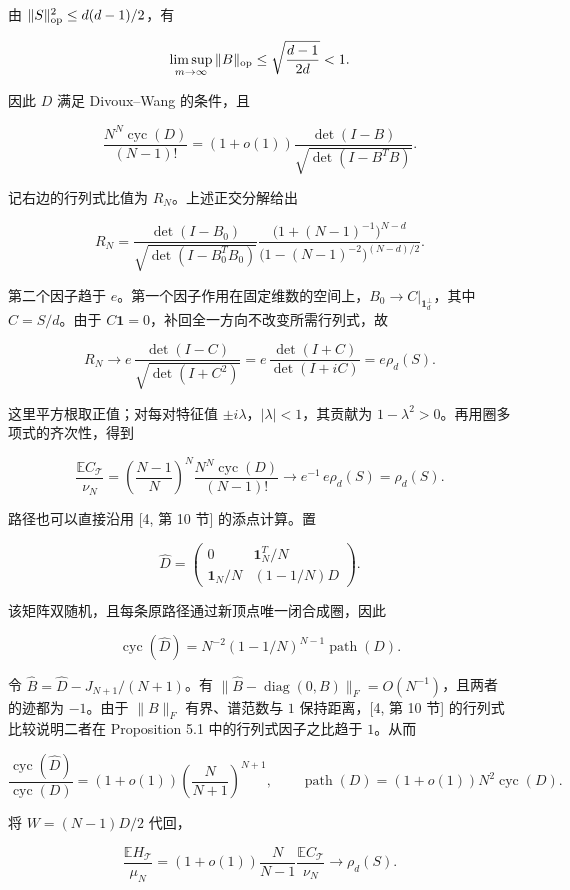 \documentclass[11pt,a4paper]{article}
\begin{document}
由 \(\|S\|_{\rm op}^2\le d(d-1)/2\)，有

\[\limsup_{m\to\infty}\|B\|_{\rm op}
\le\sqrt{\frac{d-1}{2d}}<1.\]

因此 \(D\) 满足 Divoux--Wang 的条件，且

\[\frac{N^N\operatorname{cyc}(D)}{(N-1)!}
=(1+o(1))\frac{\det(I-B)}{\sqrt{\det(I-B^TB)}}.\]

记右边的行列式比值为 \(R_N\)。上述正交分解给出

\[R_N=
\frac{\det(I-B_0)}{\sqrt{\det(I-B_0^TB_0)}}
\frac{\bigl(1+(N-1)^{-1}\bigr)^{N-d}}
{\bigl(1-(N-1)^{-2}\bigr)^{(N-d)/2}}.\]

第二个因子趋于 \(e\)。第一个因子作用在固定维数的空间上，\(B_0\to C|_{\mathbf1_d^\perp}\)，其中 \(C=S/d\)。由于 \(C\mathbf1=0\)，补回全一方向不改变所需行列式，故

\[R_N\longrightarrow
e\,\frac{\det(I-C)}{\sqrt{\det(I+C^2)}}
=e\,\frac{\det(I+C)}{\det(I+iC)}
=e\rho_d(S).\]

这里平方根取正值；对每对特征值 \(\pm i\lambda\)，\(|\lambda|<1\)，其贡献为 \(1-\lambda^2>0\)。再用圈多项式的齐次性，得到

\[\frac{\mathbb EC_{\mathcal T}}{\nu_N}
=\left(\frac{N-1}{N}\right)^N
\frac{N^N\operatorname{cyc}(D)}{(N-1)!}
\longrightarrow e^{-1}\,e\rho_d(S)=\rho_d(S).\]

路径也可以直接沿用 {[}4, 第 10 节{]} 的添点计算。置

\[\widehat D=
\begin{pmatrix}
0&\mathbf1_N^T/N\\
\mathbf1_N/N&(1-1/N)D
\end{pmatrix}.\]

该矩阵双随机，且每条原路径通过新顶点唯一闭合成圈，因此

\[\operatorname{cyc}(\widehat D)
=N^{-2}(1-1/N)^{N-1}\operatorname{path}(D).\]

令 \(\widehat B=\widehat D-J_{N+1}/(N+1)\)。有 \(\|\widehat B-\operatorname{diag}(0,B)\|_F=O(N^{-1})\)，且两者的迹都为 \(-1\)。由于 \(\|B\|_F\) 有界、谱范数与 \(1\) 保持距离，{[}4, 第 10 节{]} 的行列式比较说明二者在 Proposition 5.1 中的行列式因子之比趋于 \(1\)。从而

\[\frac{\operatorname{cyc}(\widehat D)}{\operatorname{cyc}(D)}
=(1+o(1))\left(\frac{N}{N+1}\right)^{N+1},
\qquad
\operatorname{path}(D)=(1+o(1))N^2\operatorname{cyc}(D).\]

将 \(W=(N-1)D/2\) 代回，

\[\frac{\mathbb EH_{\mathcal T}}{\mu_N}
=(1+o(1))\frac{N}{N-1}
\frac{\mathbb EC_{\mathcal T}}{\nu_N}
\longrightarrow\rho_d(S).\]
\end{document}
